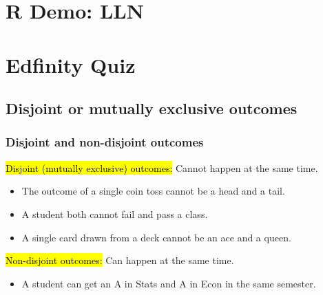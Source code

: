 \documentclass[11pt,containsverbatim,handout]{beamer}
\begin{document}
\section{R Demo: LLN}


\section{Edfinity Quiz}


\subsection{Disjoint or mutually exclusive outcomes}


\begin{frame}
\frametitle{Disjoint and non-disjoint outcomes}

\begin{center}
\end{center}

\hl{Disjoint (mutually exclusive) outcomes:} Cannot happen at the same time.
\begin{itemize}
\item The outcome of a single coin toss cannot be a head and a tail.
\item A student both cannot fail and pass a class.
\item A single card drawn from a deck cannot be an ace and a queen.
\end{itemize}

\pause

\hl{Non-disjoint outcomes:} Can happen at the same time.
\begin{itemize}
\item A student can get an A in Stats and A in Econ in the same semester.
\end{itemize}

\end{frame}
\end{document}
